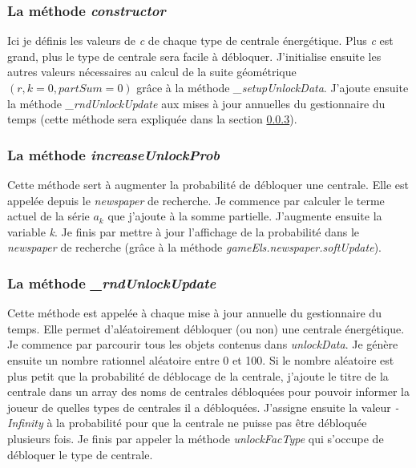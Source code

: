 \documentclass{article}
\begin{document}
        
        \subsubsection{La méthode \textit{constructor}}
        Ici je définis les valeurs de \textit{c} de chaque type de centrale énergétique. Plus \textit{c} est grand, plus le type de centrale sera facile à débloquer. J'initialise ensuite les autres valeurs nécessaires au calcul de la suite géométrique $(r, k=0, partSum=0)$ grâce à la méthode \textit{\_setupUnlockData}. J'ajoute ensuite la méthode \textit{\_rndUnlockUpdate} aux mises à jour annuelles du gestionnaire du temps (cette méthode sera expliquée dans la section \ref{rndUnlockUpdate}).
        
        \subsubsection{La méthode \textit{increaseUnlockProb}}
        Cette méthode sert à augmenter la probabilité de débloquer une centrale. Elle est appelée depuis le \textit{newspaper} de recherche.
        Je commence par calculer le terme actuel de la série $a_{k}$ que j'ajoute à la somme partielle. J'augmente ensuite la variable \textit{k}. Je finis par mettre à jour l'affichage de la probabilité dans le \textit{newspaper} de recherche (grâce à la méthode \textit{gameEls.newspaper.softUpdate}).
        
        \subsubsection{La méthode \textit{\_rndUnlockUpdate}} \label{rndUnlockUpdate}
        Cette méthode est appelée à chaque mise à jour annuelle du gestionnaire du temps. Elle permet d'aléatoirement débloquer (ou non) une centrale énergétique. Je commence par parcourir tous les objets contenus dans \textit{unlockData}. Je génère ensuite un nombre rationnel aléatoire entre 0 et 100. Si le nombre aléatoire est plus petit que la probabilité de déblocage de la centrale, j'ajoute le titre de la centrale dans un array des noms de centrales débloquées pour pouvoir informer la joueur de quelles types de centrales il a débloquées. J'assigne ensuite la valeur \textit{-Infinity} à la probabilité pour que la centrale ne puisse pas être débloquée plusieurs fois. Je finis par appeler la méthode \textit{unlockFacType} qui s'occupe de débloquer le type de centrale.
        
\end{document}
